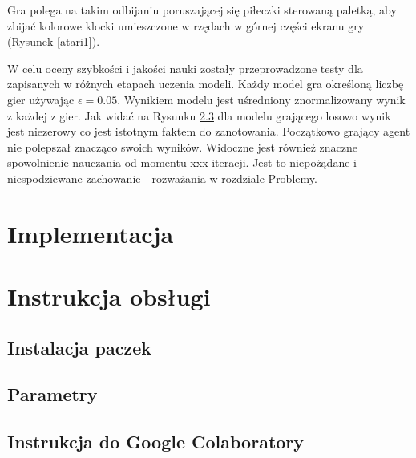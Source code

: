 \documentclass[12pt]{article}
\begin{document}
Gra polega na takim odbijaniu poruszającej się piłeczki sterowaną paletką, aby zbijać kolorowe klocki umieszczone w rzędach w górnej części ekranu gry (Rysunek \ref{atari1}).

W celu oceny szybkości i jakości nauki zostały przeprowadzone testy dla zapisanych w różnych etapach uczenia modeli. Każdy model gra określoną liczbę gier używając $\epsilon=0.05$. Wynikiem modelu jest uśredniony znormalizowany wynik z każdej z gier. Jak widać na Rysunku \ref{} dla modelu grającego losowo wynik jest niezerowy co jest istotnym faktem do zanotowania. Początkowo grający agent nie polepszał znacząco swoich wyników. Widoczne jest również znaczne spowolnienie nauczania od momentu xxx iteracji. Jest to niepożądane i niespodziewane zachowanie - rozważania w rozdziale Problemy.

\section{Implementacja}
\section{Instrukcja obsługi}
\subsection{Instalacja paczek}
\subsection{Parametry}
\subsection{Instrukcja do Google Colaboratory \cite{colab}}
\end{document}
